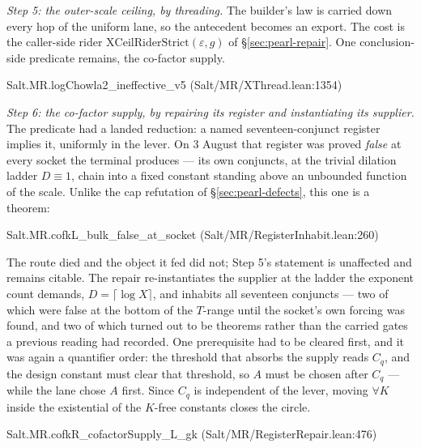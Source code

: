 \documentclass[11pt]{amsart}
\newcommand{\leanname}[1]{\par{\noindent\small\ttfamily\raggedright #1\par}}
\theoremstyle{remark}
\begin{document}
\emph{Step 5: the outer-scale ceiling, by threading.} The builder's law is
carried down every hop of the uniform lane, so the antecedent becomes an
export. The cost is the caller-side rider
$\mathrm{XCeilRiderStrict}(\varepsilon,g)$ of \S\ref{sec:pearl-repair}. One
conclusion-side predicate remains, the co-factor supply.
\leanname{Salt.MR.logChowla2\_ineffective\_v5 (Salt/MR/XThread.lean:1354)}

\emph{Step 6: the co-factor supply, by repairing its register and
instantiating its supplier.} The predicate had a landed reduction: a named
seventeen-conjunct register implies it, uniformly in the lever. On 3 August
that register was proved \emph{false} at every socket the terminal produces ---
its own conjuncts, at the trivial dilation ladder $D \equiv 1$, chain into a
fixed constant standing above an unbounded function of the scale. Unlike the
cap refutation of \S\ref{sec:pearl-defects}, this one is a theorem:
\leanname{Salt.MR.cofkL\_bulk\_false\_at\_socket
(Salt/MR/RegisterInhabit.lean:260)}
The route died and the object it fed did not; Step 5's statement is
unaffected and remains citable. The repair re-instantiates the supplier at the
ladder the exponent count demands, $D = \lceil \log X\rceil$, and inhabits all
seventeen conjuncts --- two of which were false at the bottom of the $T$-range
until the socket's own forcing was found, and two of which turned out to be
theorems rather than the carried gates a previous reading had recorded. One
prerequisite had to be cleared first, and it was again a quantifier order: the
threshold that absorbs the supply reads $C_q$, and the design constant must
clear that threshold, so $A$ must be chosen after $C_q$ --- while the lane
chose $A$ first. Since $C_q$ is independent of the lever, moving $\forall K$
inside the existential of the $K$-free constants closes the circle.
\leanname{Salt.MR.cofkR\_cofactorSupply\_L\_gk (Salt/MR/RegisterRepair.lean:476)}
\end{document}
